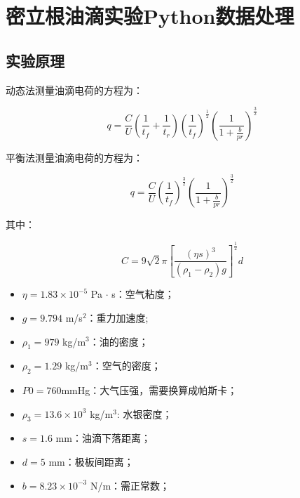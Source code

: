 \chapter{密立根油滴实验Python数据处理}

\section{实验原理}

动态法测量油滴电荷的方程为：

\begin{equation}
q = \frac{C}{U} 
\left(\frac{1}{t_f} + \frac{1}{t_r}\right) \left(\frac{1}{t_f}\right)^{\frac{1}{2}}
\left( \frac{1}{1 + \frac{b}{pr}} \right)^{\frac{3}{2}}
\end{equation}

平衡法测量油滴电荷的方程为：

\begin{equation}
q = \frac{C}{U} 
\left(\frac{1}{t_f}\right)^{\frac{3}{2}}
\left( \frac{1}{1 + \frac{b}{pr}} \right)^{\frac{3}{2}}
\end{equation}

其中：

\begin{equation}
C = 9\sqrt{2}\pi \left[ \frac{(\eta s)^3}{(\rho_1 - \rho_2) g} \right]^{\frac{1}{2}} d
\end{equation}

\begin{itemize}
  \item $\eta = 1.83 \times 10^{-5} $ Pa $\cdot$ s：空气粘度；
  \item $g = 9.794$ m/s$^2$：重力加速度;
  \item $\rho_1 = 979 $ kg/m$^3$：油的密度；
  \item $\rho_2 = 1.29$ kg/m$^3$：空气的密度；
  \item $P0 = 760 $mmHg：大气压强，需要换算成帕斯卡；
  \item $\rho_3 = 13.6 \times 10^3$ kg/m$^3$: 水银密度；
  \item $s = 1.6 $ mm：油滴下落距离；
  \item $d = 5$ mm：极板间距离；
  \item $b = 8.23 \times 10^{-3}$ N/m：需正常数；
\end{itemize}

\newpage
